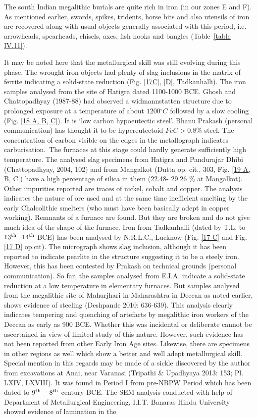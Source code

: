 The south Indian megalithic burials are quite rich in iron (in our zones E and F). As mentioned earlier, swords, spikes, tridents, horse bits and also utensils of iron are recovered along with usual objects generally associated with this period, i.e. arrowheads, spearheads, chisels, axes, fish hooks and bangles (Table~\ref{table IV.11}).

	It may be noted here that the metallurgical skill was still evolving during this phase. The wrought iron objects had plenty of slag inclusions in the matrix of ferrite indicating a solid-state reduction (Fig. \ref{17C}, \ref{D}, Tadkanhalli). The iron samples analysed from the site of Hatigra dated 1100-1000 BCE. Ghosh and Chattopadhyay (1987-88) had observed a widmannstatten structure due to prolonged exposure at a temperature of about $1200 {}^{\circ}C$ followed by a slow cooling (Fig. \ref{18 A, B, C}). It is ‘low carbon hypoeutectic steel’. Bhanu Prakash (personal communication) has thought it to be hypereutectoid $Fe C > 0.8\%$ steel. The concen\-tration of carbon visible on the edges in the metallograph indicates carburisation.~The furnaces at this stage could hardly generate sufficiently high temperature. The analysed slag specimens from Hatigra and Pandurajar Dhibi (Chattopadhyay, 2004, 102) and from Mangalkot (Dutta op. cit., 303, Fig. \ref{19 A, B, C}) have a high percentage of silica in them (22.48- 29.26 \% at Mangalkot). Other impurities reported are traces of nickel, cobalt and copper. The analysis indicates the nature of ore used and at the same time inefficient smelting by the early Chalcolithic smelters (who must have been basically adept in copper working).  Remnants of a furnace are found. But they are broken and do not give much idea of the shape of the furnace. Iron from Tadkanhalli (dated by T.L. to $13^{\rm th}$ -$14^{\rm th}$ BCE) has been analysed by N.R.L.C., Lucknow (Fig. \ref{17 C} and Fig. \ref{17 D} op.cit). The micrograph shows slag inclusion, although it has been reported to indicate pearlite in the structure suggesting it to be a steely iron. However, this has been contested by Prakash on technical grounds (personal communication). So far, the samples analysed from E.I.A. indicate a solid-state reduction at a low temperature in elementary furnaces. But samples analysed from the megalithic site of Mahurjhari in Maharashtra in Deccan as noted earlier, shows evidence of steeling (Deshpande 2010: 636-639). This analysis clearly indicates tempering and quenching of artefacts by megalithic iron workers of the Deccan as early as 900 BCE. Whether this was incidental or deliberate cannot be ascertained in view of limited study of this nature. However, such evidence has not been reported from other Early Iron Age sites. Likewise, there are specimens in other regions as well which show a better and well adept metallurgical skill. Special mention in this regards may be made of a sickle discovered by the author from excavations at Anai, near Varanasi (Tripathi \& Upadhyaya 2013: 153; Pl. LXIV, LXVIII). It was found in Period I from pre-NBPW Period which has been dated to $9^{\rm th}-8^{\rm th}$ century BCE. The SEM analysis conducted with help of Department of Metallurgical Engineering, I.I.T. Banaras Hindu University showed evidence of lamination in the 